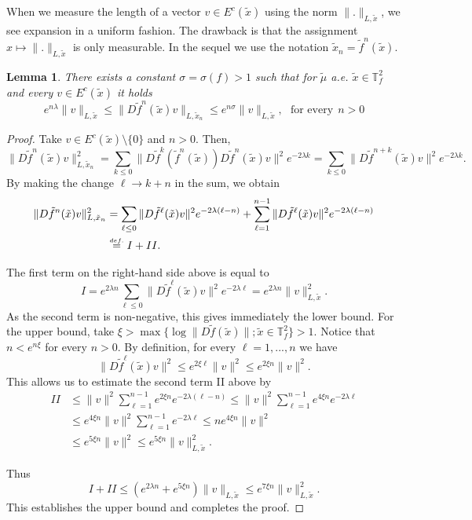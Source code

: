 \documentclass[a4paper,11pt,reqno]{amsart}
\newcommand{\TTf}{{\mathbb{T}_f^2}}
\newcommand{\eqdef}{\stackrel{\scriptscriptstyle\textrm def.}{=}}
\newcommand{\tix}{\tilde{x}}
\newcommand{\tif}{\tilde{f}}
\newtheorem{lemma}[theorem]{Lemma}
\theoremstyle{definition}
\begin{document}
When we measure the length of a vector $v\in E^c(\tix)$ using the norm $\|.\|_{L,\tix}$, we see expansion in a uniform fashion. The drawback is that the assignment $x\mapsto \|.\|_{L,\tix}$ is only measurable. In the sequel we use the notation $\tix_n=\tif^n(\tix)$.

\begin{lemma}
    \label{lem:crescelyapunovcresce}
There exists a constant $\sigma=\sigma(f)>1$ such that for $\tilde{\mu}$ a.e. $\tix\in\TTf$ and every $v\in E^c(\tix)$ it holds 
\[
e^{n\lambda}\|v\|_{L,\tix}\leq\|D\tif^n(\tix)v\|_{L,\tix_n}\leq e^{n\sigma}\|v\|_{L,\tix},\:\:\:\textrm{for every}\:\:n>0
\]
\end{lemma}


\begin{proof}
Take $v\in E^c(\tix)\setminus\{0\}$ and $n>0$. Then,
\[
\|D\tif^n(\tix)v\|^2_{L,\tix_n}=\sum_{k\leq 0}\|D\tif^k(\tif^n(\tix))D\tif^n(\tix)v\|^2e^{-2\lambda k}=\sum_{k\leq 0}\|D\tif^{n+k}(\tix)v\|^2e^{-2\lambda k}.
\]
By making the change $\ell\rightarrow k+n$ in the sum, we obtain
\begin{align*}
\|D\tif^n(\tix)v\|^2_{L,\tix_n}&=\sum_{\ell\leq 0}\|D\tif^{\ell}(\tix)v\|^2e^{-2\lambda(\ell-n)}+\sum_{\ell=1}^{n-1}\|D\tif^{\ell}(\tix)v\|^2e^{-2\lambda(\ell-n)}\nonumber \\
&\eqdef I+II.\nonumber
\end{align*}

The first term on the right-hand side above is equal to 
\[
I=e^{2\lambda n}\sum_{\ell\leq 0}\|D\tif^\ell(\tix)v\|^2e^{-2\lambda\ell}=e^{2\lambda n}\|v\|^2_{L,\tix}.
\]
As the second term is non-negative, this gives immediately the lower bound. For the upper bound, take $\xi>\max\{\log\|D\tif(\tix)\|;\tix\in\TTf\}>1$. Notice that $n<e^{n\xi}$ for every $n>0$. By definition, for every $\ell=1,...,n$ we have 
\[
\|D\tif^\ell(\tix)v\|^2\leq e^{2\xi\ell}\|v\|^2\leq e^{2\xi n}\|v\|^2.
\]
This allows us to estimate the second term II above by
\begin{align*}
  II&\leq\|v\|^2\sum_{\ell=1}^{n-1}e^{2\xi n}e^{-2\lambda(\ell-n)}\leq\|v\|^2\sum_{\ell=1}^{n-1}e^{4\xi n}e^{-2\lambda \ell}\nonumber\\
    &\leq e^{4\xi n}\|v\|^2\sum_{\ell=1}^{n-1}e^{-2\lambda\ell}\leq ne^{4\xi n}\|v\|^2\nonumber\\
    &\leq e^{5\xi n}\|v\|^2\leq e^{5\xi n}\|v\|_{L,\tix}^2\nonumber. 
\end{align*}
    
Thus
\[
I+II\leq(e^{2\lambda n}+e^{5\xi n})\|v\|_{L,\tix}\leq e^{7\xi n}\|v\|^2_{L,\tix}.
\]
This establishes the upper bound and completes the proof. 
\end{proof}
\end{document}
